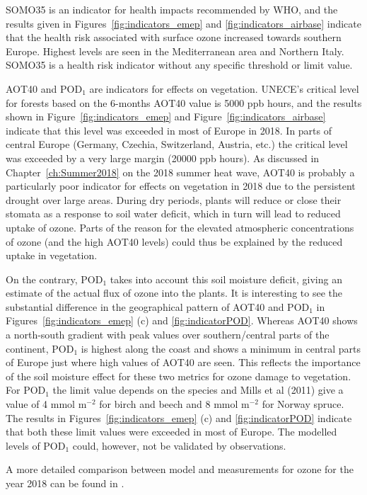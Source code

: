 SOMO35 is an indicator for health impacts recommended by WHO, and the results given in Figures~\ref{fig:indicators_emep} and \ref{fig:indicators_airbase} indicate that the health risk associated with surface ozone increased towards southern Europe. Highest levels are seen in the Mediterranean area and Northern Italy. SOMO35 is a health risk indicator without any specific threshold or limit value.

AOT40 and POD$_1$ are indicators for effects on vegetation. UNECE's critical level for forests based on the 6-months AOT40 value is 5000 ppb hours, and the results shown in Figure~\ref{fig:indicators_emep} and Figure~\ref{fig:indicators_airbase} indicate that this level was exceeded in most of Europe in 2018. In parts of central Europe (Germany, Czechia, Switzerland, Austria, etc.) the critical level was exceeded by a very large margin (20000 ppb hours). As discussed in Chapter~\ref{ch:Summer2018} on the 2018 summer heat wave, AOT40 is probably a particularly poor indicator for effects on vegetation in 2018 due to the persistent drought over large areas. During dry periods, plants will reduce or close their stomata as a response to soil water deficit, which in turn will lead to reduced uptake of ozone. Parts of the reason for the elevated atmospheric concentrations of ozone (and the high AOT40 levels) could thus be explained by the reduced uptake in vegetation. 

On the contrary, POD$_1$ takes into account this soil moisture deficit, giving an estimate of the actual flux of ozone into the plants. It is interesting to see the substantial difference in the geographical pattern of AOT40 and POD$_1$ in Figures~\ref{fig:indicators_emep} (c) and \ref{fig:indicatorPOD}. Whereas AOT40 shows a north-south gradient with peak values over southern/central parts of the continent, POD$_1$ is highest along the coast and shows a minimum in central parts of Europe just where high values of AOT40 are seen. This reflects the importance of the soil moisture effect for these two metrics for ozone damage to vegetation. For POD$_1$ the limit value depends on the species and Mills et al (2011) give a value of 4 mmol m$^{-2}$ for birch and beech and 8 mmol m$^{-2}$ for Norway spruce. The results in Figures~\ref{fig:indicators_emep} (c) and \ref{fig:indicatorPOD} indicate that both these limit values were exceeded in most of Europe. The modelled levels of POD$_1$ could, however, not be validated by observations. 

A more detailed comparison between model and measurements for ozone for the year 2018 can be found in \cite{WEB2020:O3}.



